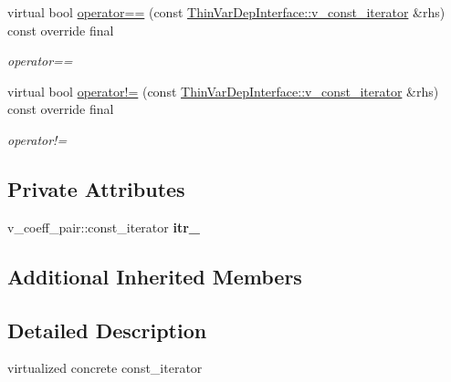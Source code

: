 \begin{DoxyCompactItemize}
virtual bool \mbox{\hyperlink{class_s_m_spp__di__unipi__it_1_1_linear_function_1_1v__const__iterator_a7a2398b23f78389d37cc9cc63cbc6d62}{operator==}} (const \mbox{\hyperlink{class_s_m_spp__di__unipi__it_1_1_thin_var_dep_interface_1_1v__const__iterator}{Thin\+Var\+Dep\+Interface\+::v\+\_\+const\+\_\+iterator}} \&rhs) const override final
\begin{DoxyCompactList}\small\item\em operator== \end{DoxyCompactList}\item 
\mbox{\label{class_s_m_spp__di__unipi__it_1_1_linear_function_1_1v__const__iterator_a08a734c5649070e449525025f48cbfcc}} 
virtual bool \mbox{\hyperlink{class_s_m_spp__di__unipi__it_1_1_linear_function_1_1v__const__iterator_a08a734c5649070e449525025f48cbfcc}{operator!=}} (const \mbox{\hyperlink{class_s_m_spp__di__unipi__it_1_1_thin_var_dep_interface_1_1v__const__iterator}{Thin\+Var\+Dep\+Interface\+::v\+\_\+const\+\_\+iterator}} \&rhs) const override final
\begin{DoxyCompactList}\small\item\em operator!= \end{DoxyCompactList}\end{DoxyCompactItemize}
\subsection*{Private Attributes}
\begin{DoxyCompactItemize}
\item 
\mbox{\label{class_s_m_spp__di__unipi__it_1_1_linear_function_1_1v__const__iterator_a1cb85ef03950ca943b62664819e8a327}} 
v\+\_\+coeff\+\_\+pair\+::const\+\_\+iterator {\bfseries itr\+\_\+}
\end{DoxyCompactItemize}
\subsection*{Additional Inherited Members}


\subsection{Detailed Description}
virtualized concrete const\+\_\+iterator 

